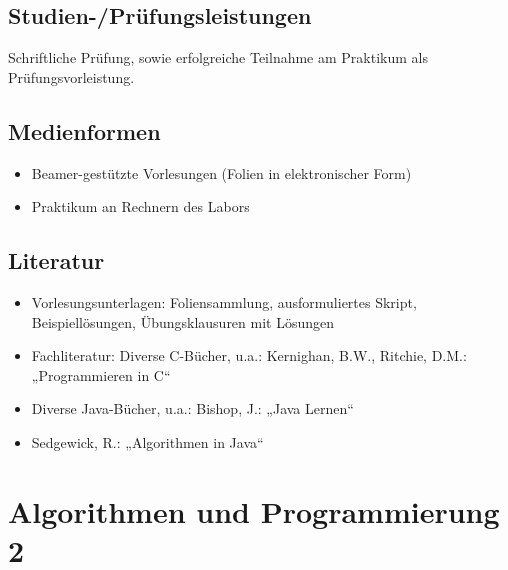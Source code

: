 \section*{Studien-/Prüfungsleistungen\label{/mi-2017/modulbeschreibungen-bachelor/BA_AlgorithmenundProgrammierung1}}\label{studien-pruxfcfungsleistungenpathlabelmi-2017modulbeschreibungen-bachelorbaux5falgorithmenundprogrammierung1}

Schriftliche Prüfung, sowie erfolgreiche Teilnahme am Praktikum als
Prüfungsvorleistung.

\section*{Medienformen\label{/mi-2017/modulbeschreibungen-bachelor/BA_AlgorithmenundProgrammierung1}}\label{medienformenpathlabelmi-2017modulbeschreibungen-bachelorbaux5falgorithmenundprogrammierung1}

\begin{itemize}
\tightlist
\item
  Beamer-gestützte Vorlesungen (Folien in elektronischer Form)
\item
  Praktikum an Rechnern des Labors
\end{itemize}

\section*{Literatur\label{/mi-2017/modulbeschreibungen-bachelor/BA_AlgorithmenundProgrammierung1}}\label{literaturpathlabelmi-2017modulbeschreibungen-bachelorbaux5falgorithmenundprogrammierung1}

\begin{itemize}
\tightlist
\item
  Vorlesungsunterlagen: Foliensammlung, ausformuliertes Skript,
  Beispiellösungen, Übungsklausuren mit Lösungen
\item
  Fachliteratur: Diverse C-Bücher, u.a.: Kernighan, B.W., Ritchie, D.M.:
  „Programmieren in C``
\item
  Diverse Java-Bücher, u.a.: Bishop, J.: „Java Lernen``
\item
  Sedgewick, R.: „Algorithmen in Java``
\end{itemize}

\chapter{Algorithmen und Programmierung
2\label{/mi-2017/modulbeschreibungen-bachelor/BA_AlgorithmenundProgrammierung2}}\label{algorithmen-und-programmierung-2pathlabelmi-2017modulbeschreibungen-bachelorbaux5falgorithmenundprogrammierung2}


